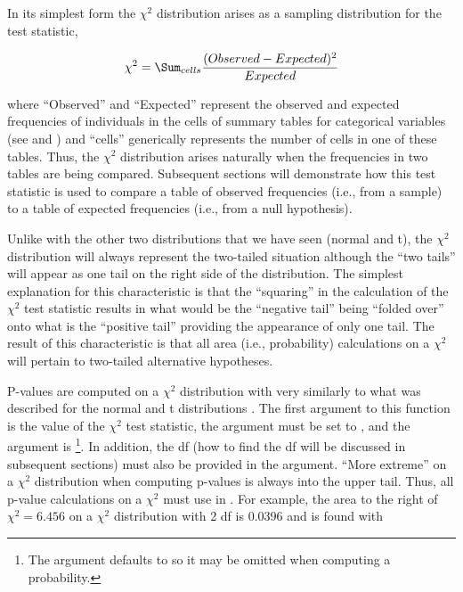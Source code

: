 \documentclass[10pt,openany]{book}\usepackage[]{graphicx}\usepackage[]{color}
\begin{document}
In its simplest form the $\chi^2$ distribution arises as a sampling distribution for the test statistic,

\[ \chi^{2} = \Sum_{cells}\frac{(Observed-Expected)^{2}}{Expected} \]

where ``Observed'' and ``Expected'' represent the observed and expected frequencies of individuals in the cells of summary tables for categorical variables (see  and ) and ``cells'' generically represents the number of cells in one of these tables.  Thus, the $\chi^2$ distribution arises naturally when the frequencies in two tables are being compared.  Subsequent sections will demonstrate how this test statistic is used to compare a table of observed frequencies (i.e., from a sample) to a table of expected frequencies (i.e., from a null hypothesis).

Unlike with the other two distributions that we have seen (normal and t), the $\chi^2$ distribution will always represent the two-tailed situation although the ``two tails'' will appear as one tail on the right side of the distribution.  The simplest explanation for this characteristic is that the ``squaring'' in the calculation of the $\chi^{2}$ test statistic results in what would be the ``negative tail'' being ``folded over'' onto what is the ``positive tail'' providing the appearance of only one tail.  The result of this characteristic is that all area (i.e., probability) calculations on a $\chi^{2}$ will pertain to two-tailed alternative hypotheses.


P-values are computed on a $\chi^2$ distribution with  very similarly to what was described for the normal  and t distributions .  The first argument to this function is the value of the $\chi^2$ test statistic, the  argument must be set to , and the  argument is \footnote{The  argument defaults to  so it may be omitted when computing a probability.}.  In addition, the df (how to find the df will be discussed in subsequent sections) must also be provided in the  argument.  ``More extreme'' on a $\chi^2$ distribution when computing p-values is always into the upper tail.  Thus, all p-value calculations on a $\chi^2$ must use  in .  For example, the area to the right of $\chi^2=6.456$ on a $\chi^2$ distribution with 2 df is 0.0396  and is found with
\end{document}
